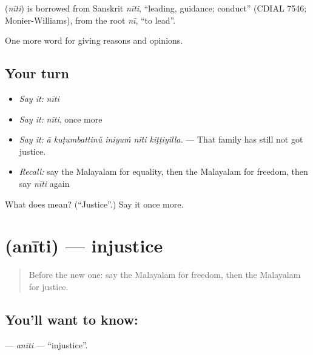 \begin{cousinweb}
\textbf{} (\emph{nīti}) is borrowed from Sanskrit \emph{nīti}, \textquotedblleft{}leading, guidance; conduct\textquotedblright{} (CDIAL 7546; Monier-Williams), from the root \emph{nī}, \textquotedblleft{}to lead\textquotedblright{}.
\end{cousinweb}

\begin{grammarlens}[title={What you've built}]
One more word for giving reasons and opinions.
\end{grammarlens}

\subsection*{Your turn}
\begin{itemize}
\raggedright
  \item \emph{Say it:} \emph{nīti}
  \item \emph{Say it:} \emph{nīti}, once more
  \item \emph{Say it:} \emph{ā kuṭumbattinŭ iniyuṁ nīti kiṭṭiyilla.} — That family has still not got justice.
  \item \emph{Recall:} say the Malayalam for equality, then the Malayalam for freedom, then say \emph{nīti} again
\end{itemize}

\begin{tcolorbox}[breakable,colback=teal!4,colframe=teal!35!black,title={Before you move on}]
What does  mean? (\textquotedblleft{}Justice\textquotedblright{}.) Say it once more.
\end{tcolorbox}
\section[\texorpdfstring{\ml{അനീതി} (anīti)}{അനീതി (anīti)}]{ (anīti) — injustice}

\label{lesson:ML-C416-aniti}



\begin{quote}
Before the new one: say the Malayalam for freedom, then the Malayalam for justice.
\end{quote}

\subsection*{You'll want to know: }
\textbf{} — \emph{anīti} — \textquotedblleft{}injustice\textquotedblright{}.

